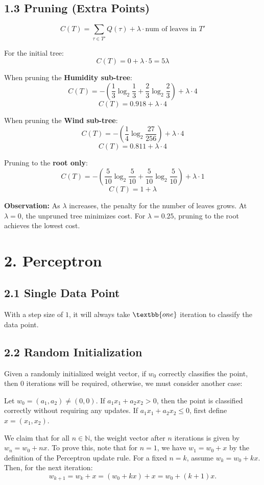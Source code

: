 \documentclass[12pt]{article}
\begin{document}
\subsection*{1.3 Pruning (Extra Points)}

\[
C(T) = \sum_{\tau \in T'} Q(\tau) + \lambda \cdot \text{num of leaves in } T'
\]

For the initial tree:
\[
C(T) = 0 + \lambda \cdot 5 = 5\lambda
\]

When pruning the \textbf{Humidity sub-tree}:
\[
C(T) = - \left( \frac{1}{3} \log_2 \frac{1}{3} + \frac{2}{3} \log_2 \frac{2}{3} \right) + \lambda \cdot 4
\]
\[
C(T) = 0.918 + \lambda \cdot 4
\]

When pruning the \textbf{Wind sub-tree}:
\[
C(T) = - \left( \frac{1}{4} \log_2 \frac{27}{256} \right) + \lambda \cdot 4
\]
\[
C(T) = 0.811 + \lambda \cdot 4
\]

Pruning to the \textbf{root only}:
\[
C(T) = - \left( \frac{5}{10} \log_2 \frac{5}{10} + \frac{5}{10} \log_2 \frac{5}{10} \right) + \lambda \cdot 1
\]
\[
C(T) = 1 + \lambda
\]

\textbf{Observation:} As \( \lambda \) increases, the penalty for the number of leaves grows. At \( \lambda = 0 \), the unpruned tree minimizes cost. For \( \lambda = 0.25 \), pruning to the root achieves the lowest cost.

\section*{2. Perceptron}
\subsection*{2.1 Single Data Point}
With a step size of $1$, it will always take $\textbb{one}$ iteration to classify the data point.

\subsection*{2.2 Random Initialization}

Given a randomly initialized weight vector, if $w_0$ correctly classifies the point, then $0$ iterations will be required, otherwise, we must consider another case: 

Let \(w_0 = (a_1, a_2) \neq (0, 0)\). If \(a_1x_1 + a_2x_2 > 0\), then the point is classified correctly without requiring any updates. If \(a_1x_1 + a_2x_2 \leq 0\), first define \(x = (x_1, x_2)\).

We claim that for all \(n \in \mathbb{N}\), the weight vector after \(n\) iterations is given by \(w_n = w_0 + n x\). To prove this, note that for \(n = 1\), we have \(w_1 = w_0 + x\) by the definition of the Perceptron update rule. For a fixed \(n = k\), assume \(w_k = w_0 + kx\). Then, for the next iteration:
\[
w_{k+1} = w_k + x = (w_0 + kx) + x = w_0 + (k + 1)x.
\]
\end{document}
